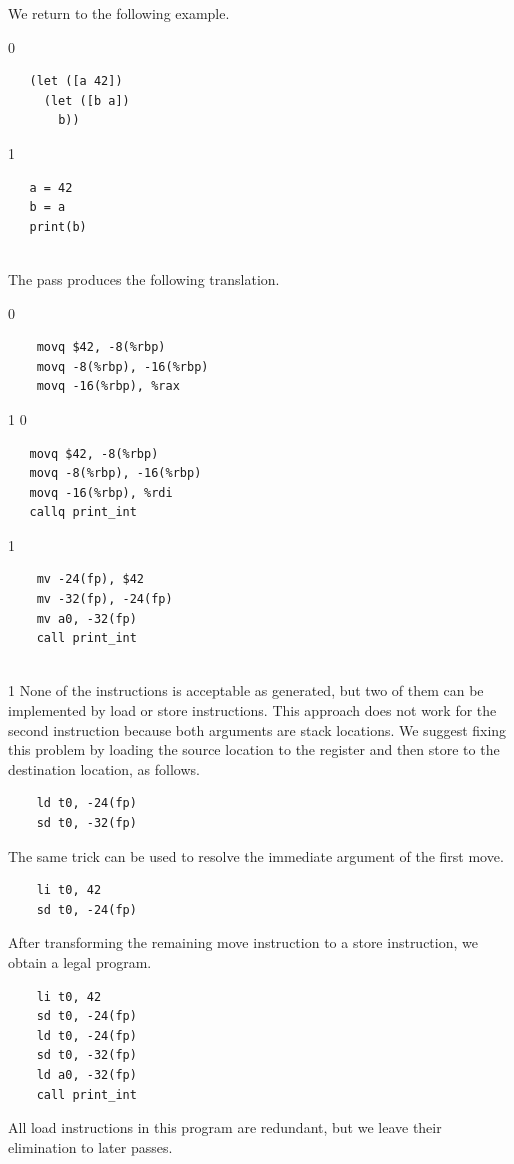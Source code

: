 \documentclass[7x10]{TimesAPriori_MIT}%
\def\racketEd{0}
\def\pythonEd{1}
\def\edition{1}
\def\xeightysixEd{0}
\def\riscvEd{1}
\def\architecture{1}
\newcommand{\pythonColor}[0]{}
\numberwithin{theorem}{chapter}
\numberwithin{definition}{chapter}
\numberwithin{equation}{chapter}
\begin{document}
We return to the following example.\\
\begin{minipage}{0.5\textwidth}
{\if\edition\racketEd
\begin{lstlisting}
   (let ([a 42])
     (let ([b a])
       b))
\end{lstlisting}
\fi}
{\if\edition\pythonEd\pythonColor
\begin{lstlisting}
   a = 42
   b = a
   print(b)
\end{lstlisting}
\fi}
\end{minipage}\\
The  pass produces the following translation. \\
\begin{minipage}{0.5\textwidth}
{\if\edition\racketEd
\begin{lstlisting}
    movq $42, -8(%rbp)
    movq -8(%rbp), -16(%rbp)
    movq -16(%rbp), %rax
\end{lstlisting}
\fi}
{\if\edition\pythonEd\pythonColor
\if\architecture\xeightysixEd
\begin{lstlisting}
   movq $42, -8(%rbp)
   movq -8(%rbp), -16(%rbp)
   movq -16(%rbp), %rdi
   callq print_int
\end{lstlisting}
\fi
\if\architecture\riscvEd
\begin{lstlisting}
    mv -24(fp), $42
    mv -32(fp), -24(fp)
    mv a0, -32(fp)
    call print_int
\end{lstlisting}
\fi
\fi}
\end{minipage}\\
\if\architecture\riscvEd
None of the  instructions is acceptable as generated, but two
of them can be implemented by load or store instructions.
This approach does not work for the second  instruction because both
arguments are stack locations.
We suggest fixing this problem by
loading the source location to the register  and then
store  to the destination location, as follows.
\begin{lstlisting}
    ld t0, -24(fp)
    sd t0, -32(fp)
\end{lstlisting}
The same trick can be used to resolve the immediate argument of the
first move.
\begin{lstlisting}
    li t0, 42
    sd t0, -24(fp)
\end{lstlisting}
After transforming the remaining move instruction to a store instruction, we obtain a legal
{\ArchName} program.
\begin{lstlisting}
    li t0, 42
    sd t0, -24(fp)
    ld t0, -24(fp)
    sd t0, -32(fp)
    ld a0, -32(fp)
    call print_int
\end{lstlisting}
All load instructions in this program are redundant, but we leave their
elimination to later passes.
\end{document}
